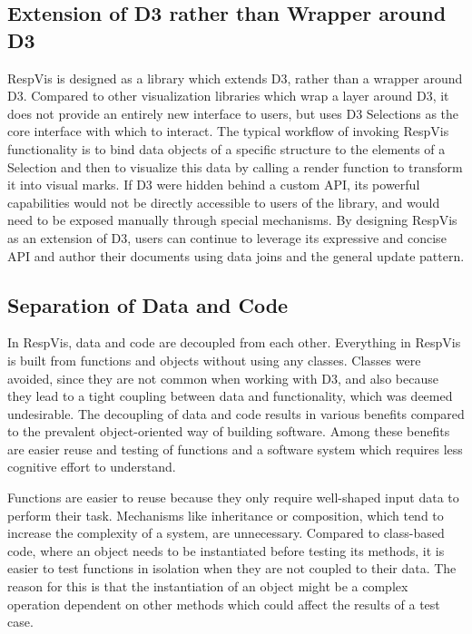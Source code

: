 \subsection{Extension of D3 rather than Wrapper around D3}

RespVis is designed as a library which extends D3, rather than a
wrapper around D3. Compared to other visualization libraries which
wrap a layer around D3, it does not provide an entirely new interface
to users, but uses D3 Selections as the core interface with which to
interact. The typical workflow of invoking RespVis functionality is to
bind data objects of a specific structure to the elements of a
Selection and then to visualize this data by calling a render function
to transform it into visual marks. If D3 were hidden behind a custom
API, its powerful capabilities would not be directly accessible to
users of the library, and would need to be exposed manually through
special mechanisms. By designing RespVis as an extension of D3, users
can continue to leverage its expressive and concise API and author
their documents using data joins and the general update pattern.



\subsection{Separation of Data and Code}

In RespVis, data and code are decoupled from each other. Everything in
RespVis is built from functions and objects without using any classes.
Classes were avoided, since they are not common when working with D3,
and also because they lead to a tight coupling between data and
functionality, which was deemed undesirable. The decoupling of data
and code results in various benefits compared to the prevalent
object-oriented way of building software. Among these benefits are
easier reuse and testing of functions and a software system which
requires less cognitive effort to understand.

Functions are easier to reuse because they only require well-shaped
input data to perform their task. Mechanisms like inheritance or
composition, which tend to increase the complexity of a system, are
unnecessary. Compared to class-based code, where an object needs to be
instantiated before testing its methods, it is easier to test
functions in isolation when they are not coupled to their data. The
reason for this is that the instantiation of an object might be a
complex operation dependent on other methods which could affect the
results of a test case.

